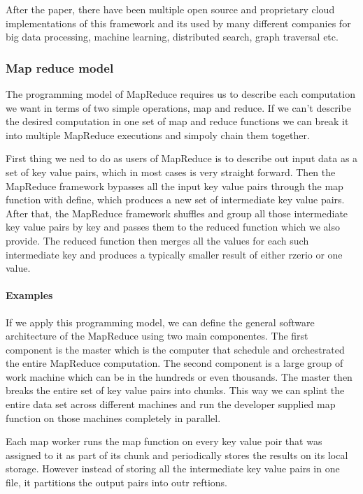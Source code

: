 \documentclass[a4paper, 11pt]{book}
\begin{document}
    After the paper, there have been multiple open source and proprietary cloud implementations of this framework and its used by many different companies for big data processing, machine learning, distributed search, graph traversal etc.

    \subsubsection{Map reduce model}
    The programming model of MapReduce requires us to describe each computation we want in terms of two simple operations, map and reduce.
    If we can't describe the desired computation in one set of map and reduce functions we can break it into multiple MapReduce executions and simpoly chain them together.

    First thing we ned to do as users of MapReduce is to describe out input data as a set of key value pairs, which in most cases is very straight forward.
    Then the MapReduce framework bypasses all the input key value pairs through the map function with define, which produces a new set of intermediate key value pairs.
    After that, the MapReduce framework shuffles and group all those intermediate key value pairs by key and passes them to the reduced function which we also provide.
    The reduced function then merges all the values for each such intermediate key and produces a typically smaller result of either rzerio or one value.

    \paragraph{Examples}

    If we apply this programming model, we can define the general software architecture of the MapReduce using two main componentes.
    The first component is the master which is the computer that schedule and orchestrated the entire MapReduce computation.
    The second component is a large group of work machine which can be in the hundreds or even thousands.
    The master then breaks the entire set of key value pairs into chunks.
    This way we can splint the entire data set across different machines and run the developer supplied map function on those machines completely in parallel.

    Each map worker runs the map function on every key value poir that was assigned to it as part of its chunk and periodically stores the results on its local storage.
    However instead of storing all the intermediate key value pairs in one file, it partitions the output pairs into outr reftions.
\end{document}
